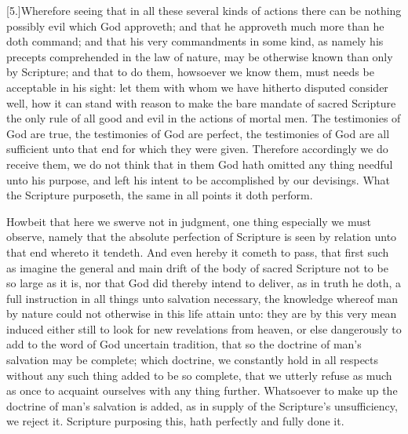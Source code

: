 [5.]Wherefore seeing that in all these several kinds of actions there can be nothing possibly evil which God approveth; and that he approveth much more than he doth command; and that his very commandments in some kind,  as namely his precepts comprehended in the law of nature, may be otherwise known than only by Scripture; and that to do them, howsoever we know them, must needs be acceptable in his sight: let them with whom we have hitherto disputed consider well, how it can stand with reason to make the bare mandate of sacred Scripture the only rule of all good and evil in the actions of mortal men. The testimonies of God are true, the testimonies of God are perfect, the testimonies of God are all sufficient unto that end for which they were given. Therefore accordingly we do receive them, we do not think that in them God hath omitted any thing needful unto his purpose, and left his intent to be accomplished by our devisings. What the Scripture purposeth, the same in all points it doth perform.

Howbeit that here we swerve not in judgment, one thing especially we must observe, namely that the absolute perfection of Scripture is seen by relation unto that end whereto it tendeth. And even hereby it cometh to pass, that first such as imagine the general and main drift of the body of sacred Scripture not to be so large as it is, nor that God did  thereby intend to deliver, as in truth he doth, a full instruction in all things unto salvation necessary, the knowledge whereof man by nature could not otherwise in this life attain unto: they are by this very mean induced either still to look for new revelations from heaven, or else dangerously to add to the word of God uncertain tradition, that so the doctrine of man’s salvation may be complete; which doctrine, we constantly hold in all respects without any such thing added to be so complete, that we utterly refuse as much as once to acquaint ourselves with any thing further. Whatsoever to make up the doctrine of man’s salvation is added, as in supply of the Scripture’s unsufficiency, we reject it. Scripture purposing this, hath perfectly and fully done it.

